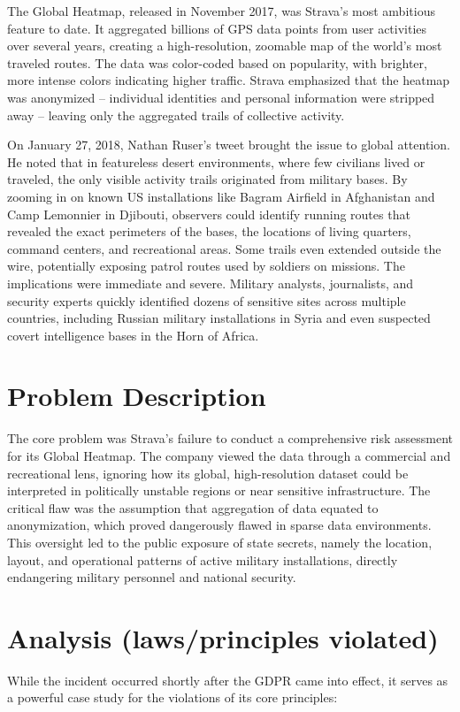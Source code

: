 \documentclass{article}
\begin{document}
The Global Heatmap, released in November 2017, was Strava's most ambitious feature to date. It aggregated billions of GPS data points from user activities over several years, creating a high-resolution, zoomable map of the world's most traveled routes. The data was color-coded based on popularity, with brighter, more intense colors indicating higher traffic. Strava emphasized that the heatmap was anonymized – individual identities and personal information were stripped away – leaving only the aggregated trails of collective activity.

On January 27, 2018, Nathan Ruser's tweet brought the issue to global attention. He noted that in featureless desert environments, where few civilians lived or traveled, the only visible activity trails originated from military bases. By zooming in on known US installations like Bagram Airfield in Afghanistan and Camp Lemonnier in Djibouti, observers could identify running routes that revealed the exact perimeters of the bases, the locations of living quarters, command centers, and recreational areas. Some trails even extended outside the wire, potentially exposing patrol routes used by soldiers on missions. The implications were immediate and severe. Military analysts, journalists, and security experts quickly identified dozens of sensitive sites across multiple countries, including Russian military installations in Syria and even suspected covert intelligence bases in the Horn of Africa.

\section{Problem Description}
The core problem was Strava's failure to conduct a comprehensive risk assessment for its Global Heatmap. The company viewed the data through a commercial and recreational lens, ignoring how its global, high-resolution dataset could be interpreted in politically unstable regions or near sensitive infrastructure. The critical flaw was the assumption that aggregation of data equated to anonymization, which proved dangerously flawed in sparse data environments. This oversight led to the public exposure of state secrets, namely the location, layout, and operational patterns of active military installations, directly endangering military personnel and national security.

\section{Analysis (laws/principles violated)}
While the incident occurred shortly after the GDPR came into effect, it serves as a powerful case study for the violations of its core principles:
\end{document}
